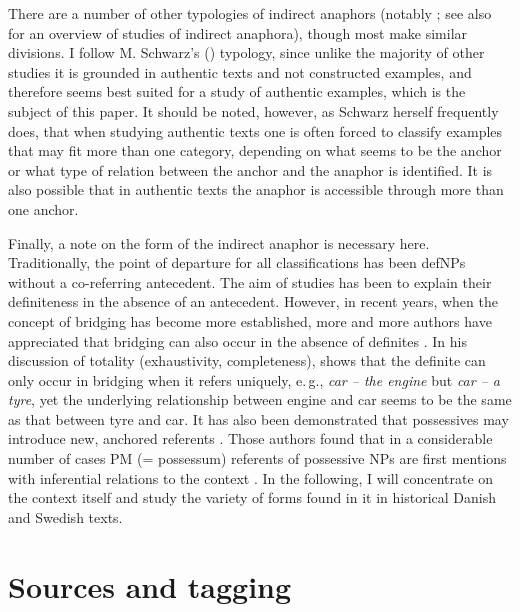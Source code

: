 \documentclass[output=paper]{langsci/langscibook}
\begin{document}
There are a number of other typologies of indirect anaphors (notably \citealt{irmer:11}; see also \citealt{zhao:14} for an overview of studies of indirect anaphora), though most make similar divisions. I follow M. Schwarz's (\citeyear{schwarz:00}) typology, since unlike the majority of other studies it is grounded in authentic texts and not constructed examples, and therefore seems best suited for a study of authentic examples, which is the subject of this paper. It should be noted, however, as Schwarz herself frequently does, that when studying authentic texts one is often forced to classify examples that may fit more than one category, depending on what seems to be the anchor or what type of relation between the anchor and the anaphor is identified. It is also possible that in authentic texts the anaphor is accessible through more than one anchor.

Finally, a note on the form of the indirect anaphor is necessary here. Traditionally, the point of departure for all classifications has been defNPs without a co-referring antecedent. The aim of studies has been to explain their definiteness in the absence of an antecedent. However, in recent years, when the concept of bridging has become more established, more and more authors have appreciated that bridging can also occur in the absence of definites \citep[][107]{asher:lascarides:98}. In his discussion of totality (exhaustivity, completeness), \cite{hawkins:78} shows that the definite can only occur in bridging when it refers uniquely, e.\,g., {\emph{car -- the engine}} but {\emph{car -- a tyre}}, yet the underlying relationship between engine and car seems to be the same as that between tyre and car. It has also been demonstrated that possessives may introduce new, anchored referents \citep{willemse:etal:09}. Those authors found that in a considerable number of cases PM (= possessum) referents of possessive NPs are first mentions with inferential relations to the context \citep[][24]{willemse:etal:09}. In the following, I will concentrate on the context itself and study the variety of forms found in it in historical Danish and Swedish texts. 


\section{Sources and tagging}\label{6sec:3}
\end{document}
